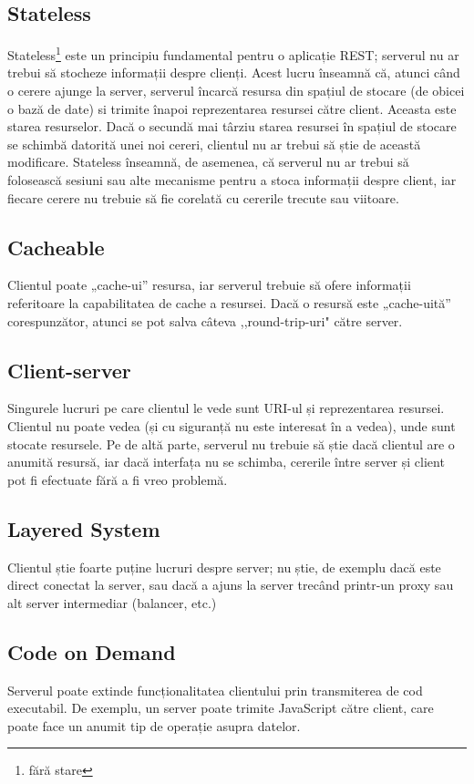 \subsection{Stateless}
Stateless\footnote{fără stare} este un principiu fundamental pentru o aplicație REST; serverul nu ar trebui să stocheze informații despre clienți. Acest lucru înseamnă că, atunci când o cerere ajunge la server, serverul încarcă resursa din spațiul de stocare (de obicei o bază de date) si trimite înapoi reprezentarea resursei către client. Aceasta este starea resurselor. Dacă o secundă mai târziu starea resursei în spațiul de stocare se schimbă datorită unei noi cereri, clientul nu ar trebui să știe de această modificare.
Stateless înseamnă, de asemenea, că serverul nu ar trebui să folosească sesiuni sau alte mecanisme pentru a stoca informații despre client, iar fiecare cerere nu trebuie să fie corelată cu cererile trecute sau viitoare.

\subsection{Cacheable}
Clientul poate „cache-ui” resursa, iar serverul trebuie să ofere informații referitoare la capabilitatea de cache a resursei. Dacă o resursă este „cache-uită” corespunzător, atunci se pot salva câteva ,,round-trip-uri" către server.

\subsection{Client-server}
Singurele lucruri pe care clientul le vede sunt URI-ul și reprezentarea resursei. Clientul nu poate vedea (și cu siguranță nu este interesat în a vedea), unde sunt stocate resursele. Pe de altă parte, serverul nu trebuie să știe dacă clientul are o anumită resursă, iar dacă interfața nu se schimba, cererile între server și client pot fi efectuate fără a fi vreo problemă.
\subsection{Layered System}
Clientul știe foarte puține lucruri despre server; nu știe, de exemplu dacă este direct conectat la server, sau dacă a ajuns la server trecând printr-un proxy sau alt server intermediar (balancer, etc.)
\subsection{Code on Demand}
Serverul poate extinde funcționalitatea clientului prin transmiterea de cod executabil. De exemplu, un server poate trimite JavaScript către client, care poate face un anumit tip de operație asupra datelor.
